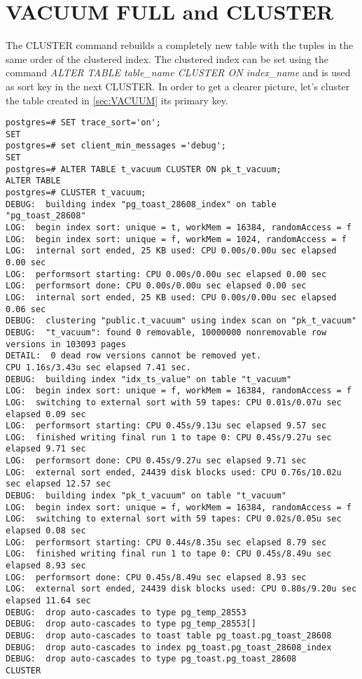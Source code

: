 \section{VACUUM FULL and CLUSTER}
The CLUSTER command rebuilds a completely new table with the tuples in the same order of the 
clustered index. The clustered index can be set using the command \textit{ALTER TABLE table\_name 
CLUSTER ON index\_name} and is used as sort key in the next CLUSTER. 
In order to get a clearer picture, let's cluster the table created in \ref{sec:VACUUM} its
primary key. 

\begin{lstlisting}[style=pgsql]
postgres=# SET trace_sort='on';
SET
postgres=# set client_min_messages ='debug';
SET
postgres=# ALTER TABLE t_vacuum CLUSTER ON pk_t_vacuum;
ALTER TABLE
postgres=# CLUSTER t_vacuum;
DEBUG:  building index "pg_toast_28608_index" on table "pg_toast_28608"
LOG:  begin index sort: unique = t, workMem = 16384, randomAccess = f
LOG:  begin index sort: unique = f, workMem = 1024, randomAccess = f
LOG:  internal sort ended, 25 KB used: CPU 0.00s/0.00u sec elapsed 0.00 sec
LOG:  performsort starting: CPU 0.00s/0.00u sec elapsed 0.00 sec
LOG:  performsort done: CPU 0.00s/0.00u sec elapsed 0.00 sec
LOG:  internal sort ended, 25 KB used: CPU 0.00s/0.00u sec elapsed 0.06 sec
DEBUG:  clustering "public.t_vacuum" using index scan on "pk_t_vacuum"
DEBUG:  "t_vacuum": found 0 removable, 10000000 nonremovable row versions in 103093 pages
DETAIL:  0 dead row versions cannot be removed yet.
CPU 1.16s/3.43u sec elapsed 7.41 sec.
DEBUG:  building index "idx_ts_value" on table "t_vacuum"
LOG:  begin index sort: unique = f, workMem = 16384, randomAccess = f
LOG:  switching to external sort with 59 tapes: CPU 0.01s/0.07u sec elapsed 0.09 sec
LOG:  performsort starting: CPU 0.45s/9.13u sec elapsed 9.57 sec
LOG:  finished writing final run 1 to tape 0: CPU 0.45s/9.27u sec elapsed 9.71 sec
LOG:  performsort done: CPU 0.45s/9.27u sec elapsed 9.71 sec
LOG:  external sort ended, 24439 disk blocks used: CPU 0.76s/10.02u sec elapsed 12.57 sec
DEBUG:  building index "pk_t_vacuum" on table "t_vacuum"
LOG:  begin index sort: unique = f, workMem = 16384, randomAccess = f
LOG:  switching to external sort with 59 tapes: CPU 0.02s/0.05u sec elapsed 0.08 sec
LOG:  performsort starting: CPU 0.44s/8.35u sec elapsed 8.79 sec
LOG:  finished writing final run 1 to tape 0: CPU 0.45s/8.49u sec elapsed 8.93 sec
LOG:  performsort done: CPU 0.45s/8.49u sec elapsed 8.93 sec
LOG:  external sort ended, 24439 disk blocks used: CPU 0.80s/9.20u sec elapsed 11.64 sec
DEBUG:  drop auto-cascades to type pg_temp_28553
DEBUG:  drop auto-cascades to type pg_temp_28553[]
DEBUG:  drop auto-cascades to toast table pg_toast.pg_toast_28608
DEBUG:  drop auto-cascades to index pg_toast.pg_toast_28608_index
DEBUG:  drop auto-cascades to type pg_toast.pg_toast_28608
CLUSTER

\end{lstlisting}

